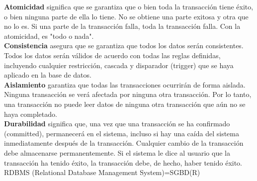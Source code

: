 \documentclass[12pt]{book}
\begin{document}
\textbf{Atomicidad} significa que se garantiza que o bien toda la transacción tiene éxito, o bien ninguna parte de ella lo tiene. No se obtiene una parte exitosa y otra que no lo es. Si una parte de la transacción falla, toda la transacción falla. Con la atomicidad, es "todo o nada".\\
\textbf{Consistencia} asegura que se garantiza que todos los datos serán consistentes. Todos los datos serán válidos de acuerdo con todas las reglas definidas, incluyendo cualquier restricción, cascada y disparador (trigger) que se haya aplicado en la base de datos.\\
\textbf{Aislamiento} garantiza que todas las transacciones ocurrirán de forma aislada. Ninguna transacción se verá afectada por ninguna otra transacción. Por lo tanto, una transacción no puede leer datos de ninguna otra transacción que aún no se haya completado.\\
\textbf{Durabilidad} significa que, una vez que una transacción se ha confirmado (committed), permanecerá en el sistema, incluso si hay una caída del sistema inmediatamente después de la transacción. Cualquier cambio de la transacción debe almacenarse permanentemente. Si el sistema le dice al usuario que la transacción ha tenido éxito, la transacción debe, de hecho, haber tenido éxito.\\

RDBMS (Relational Database Management System)=SGBD(R)
\end{document}
